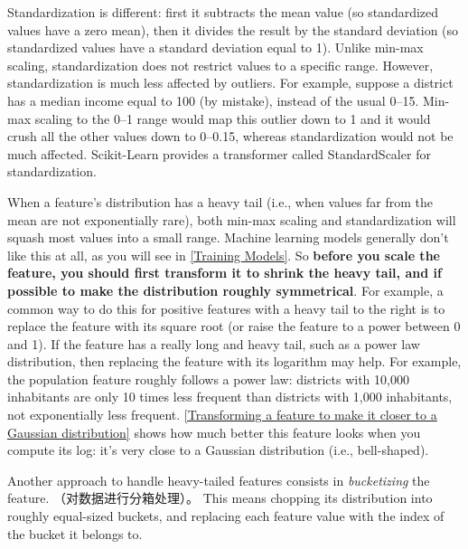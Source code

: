 Standardization is different: first it subtracts the mean value (so standardized values
have a zero mean), then it divides the result by the standard deviation (so standardized values have a standard deviation equal to 1). Unlike min-max scaling, standardization does not restrict values to a specific range. However, standardization is much
less affected by outliers. For example, suppose a district has a median income equal to 100 (by mistake), instead of the usual 0–15. Min-max scaling to the 0–1 range would map this outlier down to 1 and it would crush all the other values down to 0–0.15, whereas standardization would not be much affected. Scikit-Learn provides a transformer called StandardScaler for standardization.


When a feature's distribution has a heavy tail (i.e., when values far from the mean are not exponentially rare), both min-max scaling and standardization will squash most values into a small range. Machine learning models generally don't like this at all, as you will see in \autoref{Training Models}. So \textbf{before you scale the feature, you should first transform it to shrink the heavy tail, and if possible to make the distribution roughly symmetrical}. For example, a common way to do this for positive features with a heavy tail to the right is to replace the feature with its square root (or raise the feature to a power between 0 and 1). If the feature has a really long and heavy tail, such as a power law distribution, then replacing the feature with its logarithm may help. For example, the population feature roughly follows a power law: districts with 10,000 inhabitants are only 10 times less frequent than districts with 1,000 inhabitants, not exponentially less frequent. \autoref{Transforming a feature to make it closer to a Gaussian distribution} shows how much better this feature looks when you compute its log: it's very close to a Gaussian distribution (i.e., bell-shaped).


Another approach to handle heavy-tailed features consists in \emph{bucketizing} the feature.
（对数据进行分箱处理）。 This means chopping its distribution into roughly equal-sized buckets, and replacing each feature value with the index of the bucket it belongs to.

